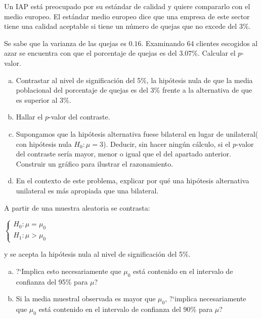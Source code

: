 \documentclass[12pt]{article}
\begin{document}
\begin{prob}
Un IAP está preocupado por su estándar de calidad y quiere compararlo con el medio europeo.
El estándar medio europeo dice que una empresa de este sector tiene una calidad aceptable
si tiene un número de quejas que no excede del 3\%.

Se sabe que la varianza de las quejas es $0.16$. Examinando $64$ clientes escogidos al azar
se encuentra con que el porcentaje de quejas es del $3.07\%$. Calcular el $p$-valor.

\begin{enumerate}[a)]
    \item Contrastar al nivel de significación del 5\%, la hipótesis nula
    de que la media poblacional del porcentaje de quejas es del 3\%
    frente a la alternativa de que es superior al 3\%.
    \item Hallar el $p$-valor del contraste.
    \item Supongamos que la hipótesis alternativa fuese bilateral en
    lugar de unilateral( con hipótesis nula $H_{0}:\mu=3$). Deducir, sin
    hacer ningún cálculo, si el $p$-valor del contraste sería mayor,
    menor o igual que el del apartado anterior. Construir un gráfico
    para ilustrar el razonamiento.
    \item En el contexto de este problema, explicar por qué una hipótesis
    alternativa unilateral es más apropiada que una bilateral.
\end{enumerate}
\end{prob}

\begin{prob}
     A partir de una muestra aleatoria se contrasta:

     $\left\{\begin{array}{l}
     H_{0}:\mu=\mu_{0}\\
     H_{1}:\mu>\mu_{0}\end{array}\right.$

     y se acepta la hipótesis nula al nivel de significación del 5\%.

     \begin{enumerate}[a)]
         \item ?`Implica esto necesariamente que $\mu_{0}$ está contenido
         en el intervalo de confianza del 95\% para $\mu$?
         \item Si la media muestral observada es mayor que $\mu_{0}$,
         ?`implica necesariamente que $\mu_{0}$ está contenido en el
         intervalo de confianza  del 90\% para $\mu$?
\end{enumerate}
\end{prob}
\end{document}
